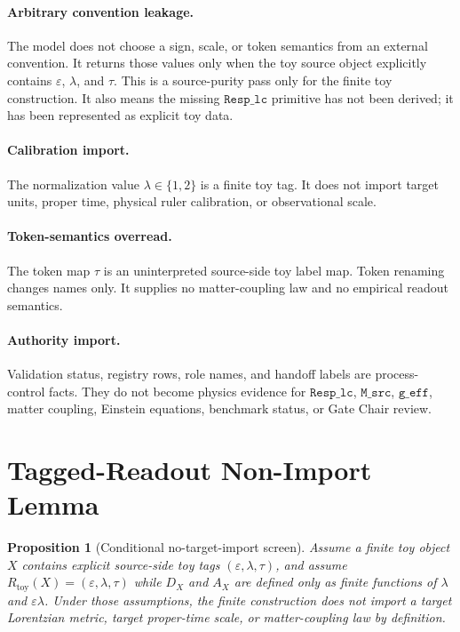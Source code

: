 \documentclass[11pt]{article}
\newtheorem{proposition}{Proposition}
\begin{document}
\paragraph{Arbitrary convention leakage.}
The model does not choose a sign, scale, or token semantics from an
external convention. It returns those values only when the toy source
object explicitly contains \(\varepsilon\), \(\lambda\), and \(\tau\).
This is a source-purity pass only for the finite toy construction. It
also means the missing \(\texttt{Resp\_lc}\) primitive has not been
derived; it has been represented as explicit toy data.

\paragraph{Calibration import.}
The normalization value \(\lambda\in\{1,2\}\) is a finite toy tag. It
does not import target units, proper time, physical ruler calibration,
or observational scale.

\paragraph{Token-semantics overread.}
The token map \(\tau\) is an uninterpreted source-side toy label map.
Token renaming changes names only. It supplies no matter-coupling law
and no empirical readout semantics.

\paragraph{Authority import.}
Validation status, registry rows, role names, and handoff labels are
process-control facts. They do not become physics evidence for
\(\texttt{Resp\_lc}\), \(\texttt{M\_src}\), \(\texttt{g\_eff}\), matter
coupling, Einstein equations, benchmark status, or Gate Chair review.

\section{Tagged-Readout Non-Import Lemma}

\begin{proposition}[Conditional no-target-import screen]
Assume a finite toy object \(X\) contains explicit source-side toy tags
\((\varepsilon,\lambda,\tau)\), and assume
\(R_{\mathrm{toy}}(X)=(\varepsilon,\lambda,\tau)\) while \(D_X\) and
\(A_X\) are defined only as finite functions of \(\lambda\) and
\(\varepsilon\lambda\). Under those assumptions, the finite construction
does not import a target Lorentzian metric, target proper-time scale, or
matter-coupling law by definition.
\end{proposition}
\end{document}
